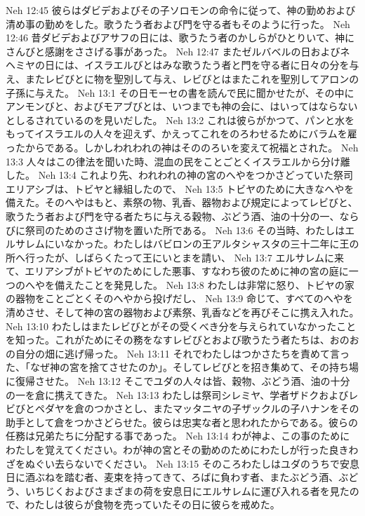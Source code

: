 Neh 12:45  彼らはダビデおよびその子ソロモンの命令に従って、神の勤めおよび清め事の勤めをした。歌うたう者および門を守る者もそのように行った。
Neh 12:46  昔ダビデおよびアサフの日には、歌うたう者のかしらがひとりいて、神にさんびと感謝をささげる事があった。
Neh 12:47  またゼルバベルの日およびネヘミヤの日には、イスラエルびとはみな歌うたう者と門を守る者に日々の分を与え、またレビびとに物を聖別して与え、レビびとはまたこれを聖別してアロンの子孫に与えた。
Neh 13:1  その日モーセの書を読んで民に聞かせたが、その中にアンモンびと、およびモアブびとは、いつまでも神の会に、はいってはならないとしるされているのを見いだした。
Neh 13:2  これは彼らがかつて、パンと水をもってイスラエルの人々を迎えず、かえってこれをのろわせるためにバラムを雇ったからである。しかしわれわれの神はそののろいを変えて祝福とされた。
Neh 13:3  人々はこの律法を聞いた時、混血の民をことごとくイスラエルから分け離した。
Neh 13:4  これより先、われわれの神の宮のへやをつかさどっていた祭司エリアシブは、トビヤと縁組したので、
Neh 13:5  トビヤのために大きなへやを備えた。そのへやはもと、素祭の物、乳香、器物および規定によってレビびと、歌うたう者および門を守る者たちに与える穀物、ぶどう酒、油の十分の一、ならびに祭司のためのささげ物を置いた所である。
Neh 13:6  その当時、わたしはエルサレムにいなかった。わたしはバビロンの王アルタシャスタの三十二年に王の所へ行ったが、しばらくたって王にいとまを請い、
Neh 13:7  エルサレムに来て、エリアシブがトビヤのためにした悪事、すなわち彼のために神の宮の庭に一つのへやを備えたことを発見した。
Neh 13:8  わたしは非常に怒り、トビヤの家の器物をことごとくそのへやから投げだし、
Neh 13:9  命じて、すべてのへやを清めさせ、そして神の宮の器物および素祭、乳香などを再びそこに携え入れた。
Neh 13:10  わたしはまたレビびとがその受くべき分を与えられていなかったことを知った。これがためにその務をなすレビびとおよび歌うたう者たちは、おのおの自分の畑に逃げ帰った。
Neh 13:11  それでわたしはつかさたちを責めて言った、「なぜ神の宮を捨てさせたのか」。そしてレビびとを招き集めて、その持ち場に復帰させた。
Neh 13:12  そこでユダの人々は皆、穀物、ぶどう酒、油の十分の一を倉に携えてきた。
Neh 13:13  わたしは祭司シレミヤ、学者ザドクおよびレビびとペダヤを倉のつかさとし、またマッタニヤの子ザックルの子ハナンをその助手として倉をつかさどらせた。彼らは忠実な者と思われたからである。彼らの任務は兄弟たちに分配する事であった。
Neh 13:14  わが神よ、この事のためにわたしを覚えてください。わが神の宮とその勤めのためにわたしが行った良きわざをぬぐい去らないでください。
Neh 13:15  そのころわたしはユダのうちで安息日に酒ぶねを踏む者、麦束を持ってきて、ろばに負わす者、またぶどう酒、ぶどう、いちじくおよびさまざまの荷を安息日にエルサレムに運び入れる者を見たので、わたしは彼らが食物を売っていたその日に彼らを戒めた。
